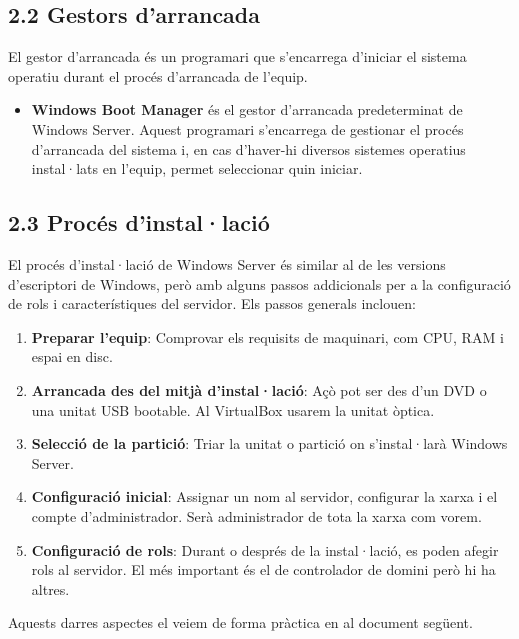 \documentclass[
  a4paper,
]{article}
\providecommand{\tightlist}{%
  \setlength{\itemsep}{0pt}\setlength{\parskip}{0pt}}
\begin{document}
\subsection{2.2 Gestors d'arrancada}\label{gestors-darrancada}

El gestor d'arrancada és un programari que s'encarrega d'iniciar el
sistema operatiu durant el procés d'arrancada de l'equip.

\begin{itemize}
\tightlist
\item
  \textbf{Windows Boot Manager} és el gestor d'arrancada predeterminat
  de Windows Server. Aquest programari s'encarrega de gestionar el
  procés d'arrancada del sistema i, en cas d'haver-hi diversos sistemes
  operatius instal·lats en l'equip, permet seleccionar quin iniciar.
\end{itemize}

\subsection{2.3 Procés d'instal·lació}\label{procuxe9s-dinstallaciuxf3}

El procés d'instal·lació de Windows Server és similar al de les versions
d'escriptori de Windows, però amb alguns passos addicionals per a la
configuració de rols i característiques del servidor. Els passos
generals inclouen:

\begin{enumerate}
\def\labelenumi{\arabic{enumi}.}
\tightlist
\item
  \textbf{Preparar l'equip}: Comprovar els requisits de maquinari, com
  CPU, RAM i espai en disc.
\item
  \textbf{Arrancada des del mitjà d'instal·lació}: Açò pot ser des d'un
  DVD o una unitat USB bootable. Al VirtualBox usarem la unitat òptica.
\item
  \textbf{Selecció de la partició}: Triar la unitat o partició on
  s'instal·larà Windows Server.
\item
  \textbf{Configuració inicial}: Assignar un nom al servidor, configurar
  la xarxa i el compte d'administrador. Serà administrador de tota la
  xarxa com vorem.
\item
  \textbf{Configuració de rols}: Durant o després de la instal·lació, es
  poden afegir rols al servidor. El més important és el de controlador
  de domini però hi ha altres.
\end{enumerate}

Aquests darres aspectes el veiem de forma pràctica en al document
següent.
\end{document}
